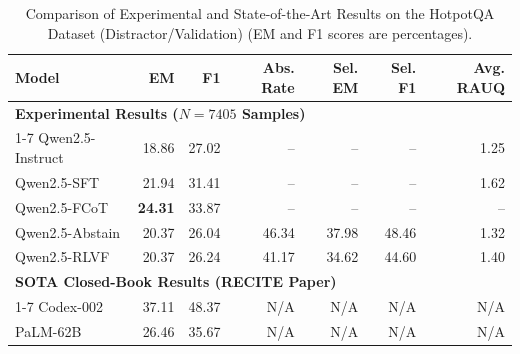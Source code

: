 \documentclass{article}
\begin{document}
\begin{table}[H]
\centering
\caption{Comparison of Experimental and State-of-the-Art Results on the HotpotQA Dataset (Distractor/Validation) (EM and F1 scores are percentages).}
\label{tab:hotpotqa_comparison}
\begin{tabular}{lrrrrrr}
    \toprule
    \textbf{Model} & \textbf{EM} & \textbf{F1} & \textbf{Abs. Rate} & \textbf{Sel. EM} & \textbf{Sel. F1} & \textbf{Avg. RAUQ} \\
    \midrule
    \multicolumn{7}{l}{\textbf{Experimental Results ($N=7405$ Samples)}} \\
    \cmidrule(lr){1-7}
    Qwen2.5-Instruct & 18.86 & 27.02 & -- & -- & -- & 1.25 \\
    Qwen2.5-SFT & 21.94 & 31.41 & -- & -- & -- & 1.62 \\
    Qwen2.5-FCoT & \textbf{24.31} & 33.87 & -- & -- & -- & -- \\
    Qwen2.5-Abstain & 20.37 & 26.04 & 46.34 & 37.98 & 48.46 & 1.32 \\
    Qwen2.5-RLVF & 20.37 & 26.24 & 41.17 & 34.62 & 44.60 & 1.40 \\
    \midrule
    \multicolumn{7}{l}{\textbf{SOTA Closed-Book Results (RECITE Paper)}} \\
    \cmidrule(lr){1-7}
    Codex-002 & 37.11 & 48.37 & N/A & N/A & N/A & N/A \\
    PaLM-62B & 26.46 & 35.67 & N/A & N/A & N/A & N/A \\
    \bottomrule
\end{tabular}
\end{table}
\end{document}
